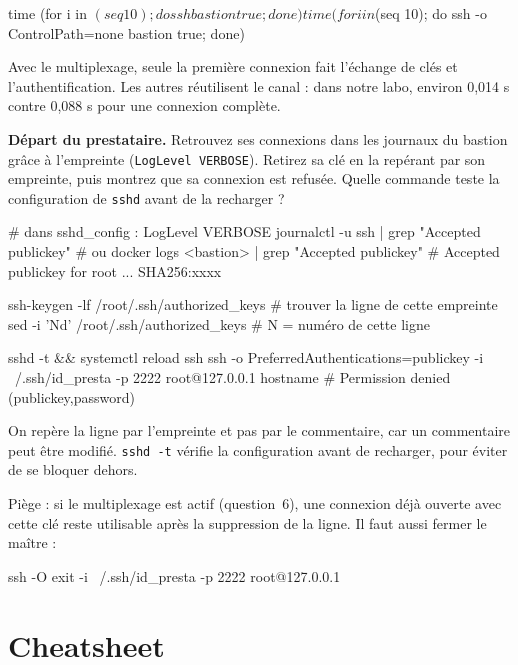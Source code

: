 \documentclass[a4paper,10pt]{exam}
\begin{document}
\begin{questions}
\begin{solution}
\begin{bashcode}
time (for i in $(seq 10); do ssh bastion true; done)
time (for i in $(seq 10); do ssh -o ControlPath=none bastion true; done)
\end{bashcode}
Avec le multiplexage, seule la première connexion fait l'échange de clés et
l'authentification. Les autres réutilisent le canal : dans notre labo, environ 0,014 s
contre 0,088 s pour une connexion complète.
\end{solution}
\question \textbf{Départ du prestataire.} Retrouvez ses connexions dans les journaux du
bastion grâce à l'empreinte (\texttt{LogLevel VERBOSE}). Retirez sa clé en la repérant
par son empreinte, puis montrez que sa connexion est refusée. Quelle commande teste la
configuration de \texttt{sshd} avant de la recharger ?
\begin{solution}
\begin{bashcode}
# dans sshd_config : LogLevel VERBOSE
journalctl -u ssh | grep "Accepted publickey"     # ou docker logs <bastion> | grep "Accepted publickey"
# Accepted publickey for root ... SHA256:xxxx

ssh-keygen -lf /root/.ssh/authorized_keys   # trouver la ligne de cette empreinte
sed -i 'Nd' /root/.ssh/authorized_keys      # N = numéro de cette ligne

sshd -t && systemctl reload ssh
ssh -o PreferredAuthentications=publickey -i ~/.ssh/id_presta -p 2222 root@127.0.0.1 hostname
# Permission denied (publickey,password)
\end{bashcode}
On repère la ligne par l'empreinte et pas par le commentaire, car un commentaire peut être
modifié. \texttt{sshd -t} vérifie la configuration avant de recharger, pour éviter de se
bloquer dehors.

Piège : si le multiplexage est actif (question~6), une connexion déjà ouverte avec cette clé
reste utilisable après la suppression de la ligne. Il faut aussi fermer le maître :
\begin{bashcode}
ssh -O exit -i ~/.ssh/id_presta -p 2222 root@127.0.0.1
\end{bashcode}
\end{solution}
\end{questions}

\section{Cheatsheet}
\end{document}
